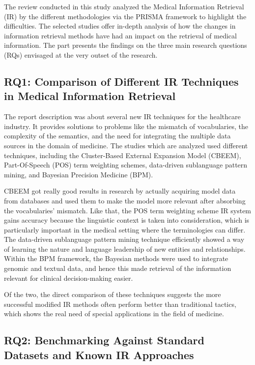 \documentclass[conference]{IEEEtran}
\begin{document}
The review conducted in this study analyzed the Medical Information Retrieval (IR) by the different methodologies via the PRISMA framework to highlight the difficulties. The selected studies offer in-depth analysis of how the changes in information retrieval methods have had an impact on the retrieval of medical information. The part presents the findings on the three main research questions (RQs) envisaged at the very outset of the research.

\subsection{RQ1: Comparison of Different IR Techniques in Medical Information Retrieval}

The report description was about several new IR techniques for the healthcare industry. It provides solutions to problems like the mismatch of vocabularies, the complexity of the semantics, and the need for integrating the multiple data sources in the domain of medicine. The studies which are analyzed used different techniques, including the Cluster-Based External Expansion Model (CBEEM), Part-Of-Speech (POS) term weighting schemes, data-driven sublanguage pattern mining, and Bayesian Precision Medicine (BPM).

CBEEM got really good results in research by actually acquiring model data from databases and used them to make the model more relevant after absorbing the vocabularies' mismatch. Like that, the POS term weighting scheme IR system gains accuracy because the linguistic context is taken into consideration, which is particularly important in the medical setting where the terminologies can differ. The data-driven sublanguage pattern mining technique efficiently showed a way of learning the nature and language leadership of new entities and relationships. Within the BPM framework, the Bayesian methods were used to integrate genomic and textual data, and hence this made retrieval of the information relevant for clinical decision-making easier.

Of the two, the direct comparison of these techniques suggests the more successful modified IR methods often perform better than traditional tactics, which shows the real need of special applications in the field of medicine.

\subsection{RQ2: Benchmarking Against Standard Datasets and Known IR Approaches}
\end{document}
